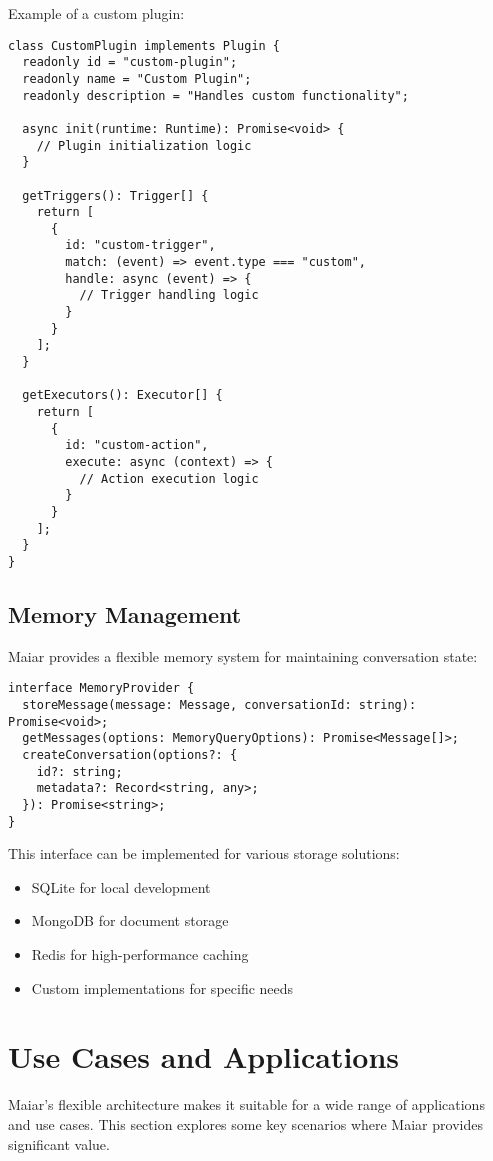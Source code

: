 \documentclass[12pt]{article}
\begin{document}
Example of a custom plugin:

\begin{verbatim}
class CustomPlugin implements Plugin {
  readonly id = "custom-plugin";
  readonly name = "Custom Plugin";
  readonly description = "Handles custom functionality";

  async init(runtime: Runtime): Promise<void> {
    // Plugin initialization logic
  }

  getTriggers(): Trigger[] {
    return [
      {
        id: "custom-trigger",
        match: (event) => event.type === "custom",
        handle: async (event) => {
          // Trigger handling logic
        }
      }
    ];
  }

  getExecutors(): Executor[] {
    return [
      {
        id: "custom-action",
        execute: async (context) => {
          // Action execution logic
        }
      }
    ];
  }
}
\end{verbatim}

\subsection{Memory Management}
Maiar provides a flexible memory system for maintaining conversation state:

\begin{verbatim}
interface MemoryProvider {
  storeMessage(message: Message, conversationId: string): Promise<void>;
  getMessages(options: MemoryQueryOptions): Promise<Message[]>;
  createConversation(options?: {
    id?: string;
    metadata?: Record<string, any>;
  }): Promise<string>;
}
\end{verbatim}

This interface can be implemented for various storage solutions:
\begin{itemize}
    \item SQLite for local development
    \item MongoDB for document storage
    \item Redis for high-performance caching
    \item Custom implementations for specific needs
\end{itemize}

\section{Use Cases and Applications}
Maiar's flexible architecture makes it suitable for a wide range of applications and use cases. This section explores some key scenarios where Maiar provides significant value.
\end{document}
